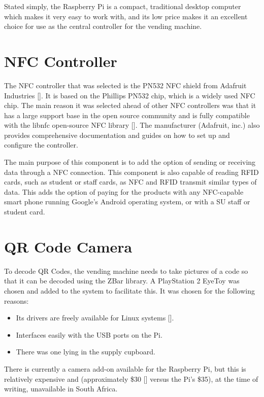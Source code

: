 Stated simply, the Raspberry Pi is a compact, traditional desktop computer which makes it very
easy to work with, and its low price makes it an excellent choice for use as the central
controller for the vending machine.

\section{NFC Controller}

The NFC controller that was selected is the PN532 NFC shield from Adafruit Industries
[\cite{website:adafruit-nfc}]. It is based on
the Phillips PN532 chip, which is a widely used NFC chip. The main reason it was selected ahead
of other NFC controllers was that it has a large support base in the open source
community and is fully compatible with the libnfc open-source NFC library
[\cite{website:libnfc-hardware}]. The manufacturer (Adafruit, inc.) also provides comprehensive
documentation and guides on how to set up and configure the controller.
 
The main purpose of this component is to add the option of sending or receiving data through a NFC connection.
This component is also capable of reading RFID cards, such as student or staff cards, as NFC
and RFID transmit similar types of data. This adds the option of paying for the products with 
any NFC-capable smart phone running Google's Android operating system, or with a SU staff or
student card.

\section{QR Code Camera}

To decode QR Codes, the vending machine needs to take pictures of a code so that it can be
decoded using the ZBar library. A PlayStation 2 EyeToy was chosen and added to the system to
facilitate this. It was chosen for the following reasons:

\begin{itemize}
  \item Its drivers are freely available for Linux systems [\cite{website:webcam-drivers}].
  \item Interfaces easily with the USB ports on the Pi.
  \item There was one lying in the supply cupboard.
\end{itemize}

There is currently a camera add-on available for the Raspberry Pi, but this is relatively
expensive and (approximately \$30 [\cite{website:raspi-camera}] versus the Pi's \$35), at the
time of writing, unavailable in South Africa.

